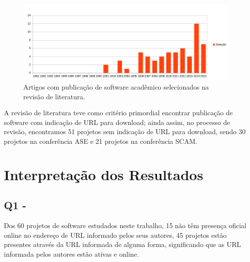 \begin{figure}[h]
  \center
  \includegraphics[scale=0.65]{imagens/artigos-com-software-por-ano.png}
  \caption{Artigos com publicação de software acadêmico selecionados na revisão de literatura.}
  \label{artigos-com-software-por-ano}
\end{figure}

A revisão de literatura teve como critério primordial encontrar publicação de
software com indicação de URL para download; ainda assim, no processo de
revisão, encontramos 51 projetos sem indicação de URL para download, sendo 30 projetos
na conferência ASE e 21 projetos na conferência SCAM.



\section{Interpretação dos Resultados} \label{estudo1:interpretacao}

\subsection{Q1 - \EstudoUmQuestaoUm} %

Dos 60 projetos de software estudados neste trabalho, 15 não têm presença
oficial online no endereço de URL informado pelos seus autores, 45 projetos
estão presentes através da URL informada de alguma forma, significando que as
URL informada pelos autores estão ativas e online.

